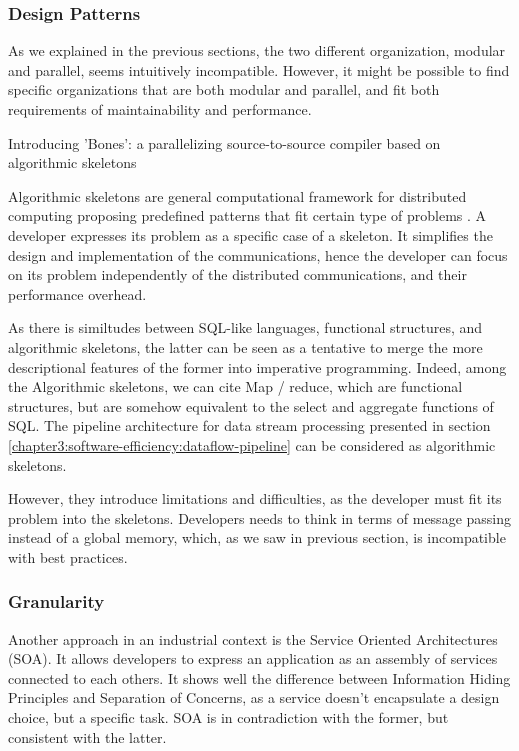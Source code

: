 \subsubsection{Design Patterns}

As we explained in the previous sections, the two different organization, modular and parallel, seems intuitively incompatible.
However, it might be possible to find specific organizations that are both modular and parallel, and fit both requirements of maintainability and performance.

Introducing 'Bones': a parallelizing source-to-source compiler based on algorithmic skeletons \cite{Nugteren2012}

Algorithmic skeletons are general computational framework for distributed computing proposing predefined patterns that fit certain type of problems \cite{Cole1988, Dean2008, McCool2010, Gonzalez-Velez2010}.
A developer expresses its problem as a specific case of a skeleton.
It simplifies the design and implementation of the communications, hence the developer can focus on its problem independently of the distributed communications, and their performance overhead.

As there is similtudes between SQL-like languages, functional structures, and algorithmic skeletons, the latter can be seen as a tentative to merge the more descriptional features of the former into imperative programming.
Indeed, among the Algorithmic skeletons, we can cite Map / reduce, which are functional structures, but are somehow equivalent to the select and aggregate functions of SQL.
The pipeline architecture for data stream processing presented in section \ref{chapter3:software-efficiency:dataflow-pipeline} can be considered as algorithmic skeletons.

However, they introduce limitations and difficulties, as the developer must fit its problem into the skeletons.
Developers needs to think in terms of message passing instead of a global memory, which, as we saw in previous section, is incompatible with best practices.

\subsubsection{Granularity}

Another approach in an industrial context is the Service Oriented Architectures (SOA).
It allows developers to express an application as an assembly of services connected to each others.
It shows well the difference between Information Hiding Principles and Separation of Concerns, as a service doesn't encapsulate a design choice, but a specific task.
SOA is in contradiction with the former, but consistent with the latter.

